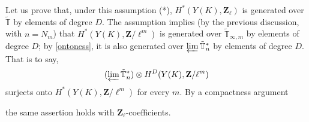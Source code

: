 \documentclass[10pt]{amsart}
\newcommand{\Z}{\mathbf{Z}}
\newcommand{\gHecke}{\tilde{\mathbb{T}}}
\theoremstyle{remark}
\begin{document}
  
  Let us prove that, under this assumption (*), $H^*(Y(K), \Z_{\ell})$ is generated over $\gHecke$ by elements  of degree $D$.  
    The assumption implies (by the previous discussion, with $n=N_m$) that $H^*(Y(K), \Z/\ell^m)$ is generated over
 $\gHecke_{\infty,m}$ by elements of degree $D$; by \eqref{ontoness}, it is also generated over $\varprojlim \gHecke_n^*$   by elements of degree $D$.
 That is to say,
 $$  (\varprojlim \gHecke_n^*) \otimes H^{D}(Y(K), \Z/\ell^m)$$
 surjects onto $H^*(Y(K), \Z/\ell^m)$ for every $m$.  
 By a compactness argument

  the same assertion holds with $\Z_{\ell}$-coefficients.  
 

 
 
 
 
\end{document}
